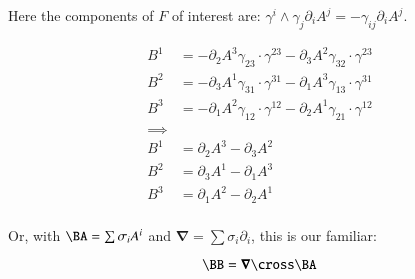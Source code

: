\documentclass{article}
\newcommand{\spacegrad}[0]{\boldsymbol{\nabla}}
\begin{document}
Here the components of $F$ of interest are: $\gamma^i \wedge \gamma_j \partial_i A^j = -\gamma_{ij} \partial_i A^j$.

\begin{align*}
B^1 &= - \partial_2 A^3 \gamma_{23} \cdot \gamma^{23} - \partial_3 A^2 \gamma_{32} \cdot \gamma^{23} \\
B^2 &= - \partial_3 A^1 \gamma_{31} \cdot \gamma^{31} - \partial_1 A^3 \gamma_{13} \cdot \gamma^{31} \\
B^3 &= - \partial_1 A^2 \gamma_{12} \cdot \gamma^{12} - \partial_2 A^1 \gamma_{21} \cdot \gamma^{12} \\
\implies \\
B^1 &= \partial_2 A^3 - \partial_3 A^2 \\
B^2 &= \partial_3 A^1 - \partial_1 A^3 \\
B^3 &= \partial_1 A^2 - \partial_2 A^1 \\
\end{align*}

Or, with $\BA = \sum \sigma_i A^i$ and $\spacegrad = \sum \sigma_i \partial_i$, this is our familiar:

\begin{equation}
\BB = \spacegrad \cross \BA
\end{equation}
\end{document}
